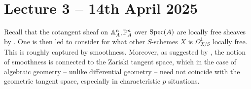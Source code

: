\section{Lecture 3 -- 14th April 2025}\label{sec: lecture 3}
Recall that the cotangent sheaf on $\mathbb{A}^{n}_{A},\mathbb{P}^{n}_{A}$ over $\operatorname{Spec}(A)$ are locally free sheaves by . One is then led to consider for what other $S$-schemes $X$ is $\Omega^{1}_{X/S}$ locally free. This is roughly captured by smoothness. Moreover, as suggested by , the notion of smoothness is connected to the Zariski tangent space, which in the case of algebraic geometry -- unlike differential geometry -- need not coincide with the geometric tangent space, especially in characteristic $p$ situations. 

